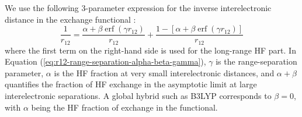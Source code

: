 \documentclass[landscape,a0b,final]{a0poster}
\newenvironment{poster}{
  \begin{center}
  \begin{minipage}[c]{0.98\textwidth}
}{
  \end{minipage} 
  \end{center}
}
\begin{document}
\begin{poster}
\begin{multicols}{3}
    We use the following 3-parameter expression for the inverse
    interelectronic distance in the exchange functional
    \cite{yanai_new_2004}:
    \begin{equation}
    \label{eq:r12-range-separation-alpha-beta-gamma}
    \frac{1}{r_{12}} =
    \frac{\alpha + \beta \operatorname{erf} (\gamma r_{12})}{r_{12}} + 
    \frac{1-[\alpha + \beta \operatorname{erf} (\gamma r_{12})]}{r_{12}} 
    \end{equation}
    where the first term on the right-hand side is used for the long-range
    HF part. In Equation (\ref{eq:r12-range-separation-alpha-beta-gamma}),
    $\gamma$ is the range-separation parameter, $\alpha$ is the HF
    fraction at very small interelectronic distances, and $\alpha+\beta$
    quantifies the fraction of HF exchange in the asymptotic limit at
    large interelectronic separations. A global hybrid such as B3LYP
    corresponds to $\beta = 0$, with $\alpha$ being the HF fraction of
    exchange in the functional.


\end{multicols}
\end{poster}
\end{document}
